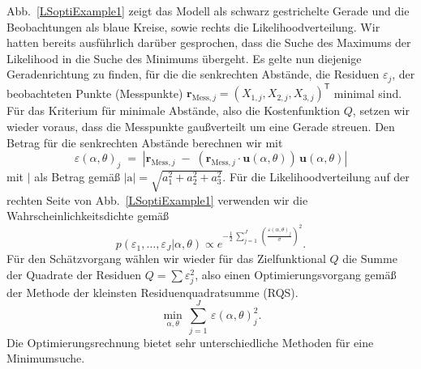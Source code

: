 Abb.~\ref{LSoptiExample1} zeigt das Modell als schwarz gestrichelte Gerade und die Beobachtungen als blaue Kreise, sowie rechts die Likelihoodverteilung. Wir hatten bereits ausführlich darüber gesprochen, dass die Suche des Maximums der Likelihood in die Suche des Minimums übergeht. Es gelte nun diejenige Geradenrichtung zu finden, für die die senkrechten Abstände,
die Residuen $\varepsilon_j$,  der beobachteten Punkte (Messpunkte) $\mathbf{r}_{\mathrm{Mess},j} = (X_{1,j}, X_{2,j}, X_{3,j})^\mathsf{T}$ minimal sind. Für das Kriterium für minimale Abstände, also die Kostenfunktion $Q$, setzen wir wieder voraus, dass die Messpunkte gaußverteilt um eine Gerade streuen. Den Betrag für die senkrechten Abstände berechnen wir mit
\begin{equation}
\varepsilon(\alpha,\theta)_j \; = \; \left| \mathbf{r}_{\mathrm{Mess},j} \; - \;
( \mathbf{r}_{\mathrm{Mess},j} \cdot \mathbf{u}(\alpha,\theta) ) \, \mathbf{u}(\alpha,\theta) \right|
\end{equation}
mit $|$ als Betrag gemäß $| \mathrm{a} | = \sqrt{a_1^2 + a_2^2 + a_3^2}$.
Für die Likelihoodverteilung auf der rechten Seite von Abb.~\ref{LSoptiExample1} verwenden wir
die Wahrscheinlichkeitsdichte gemäß
\begin{equation}
p(\varepsilon_1,\dots,\varepsilon_J | \alpha, \theta)
\propto e^{-\frac{1}{2} \, \sum\limits_{j=1}^J \, \left(\frac{\varepsilon(\alpha,\theta)_j}{\sigma} \right)^2} .
\end{equation}
Für den Schätzvorgang wählen wir wieder für das Zielfunktional $Q$ die Summe der Quadrate der Residuen $Q = \sum \varepsilon_j^2$,
also einen Optimierungsvorgang gemäß der Methode der kleinsten
Residuenquadratsumme (RQS).
\begin{equation}
\min_{\alpha,\theta} \, \sum\limits_{j=1}^J \, \varepsilon(\alpha,\theta)_j^2 .
\end{equation}
Die Optimierungsrechnung bietet sehr unterschiedliche Methoden für eine Minimumsuche.

